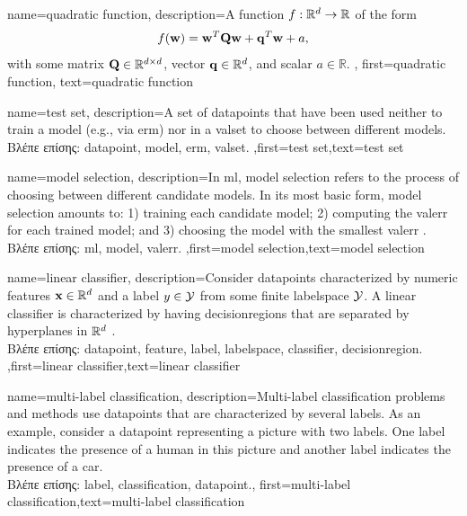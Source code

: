 {name={quadratic function},
	description={A function $f: \mathbb{R}^{d} \rightarrow \mathbb{R}$ of the form 
		$$f({\bf w}) =  {\bf w}^{T} \mathbf{Q} \mathbf{w} + \mathbf{q}^{T} {\bf w}+a,$$ with 
		some matrix $\mathbf{Q} \in \mathbb{R}^{d \times d}$, vector ${\bf q} \in \mathbb{R}^{d}$, 
		and scalar $a \in \mathbb{R}$.  },
		first={quadratic function},
		text={quadratic function}  
}

{name={test set},
	description={A set of \gls{datapoint}s that have  
		been used neither to train a \gls{model} (e.g., via \gls{erm}) nor in a \gls{valset} 
		to choose between different \gls{model}s.\\
		\foreignlanguage{greek}{Βλέπε επίσης:} \gls{datapoint}, \gls{model}, \gls{erm}, \gls{valset}.
		},first={test set},text={test set}  
}

{name={model selection},
	description={In \gls{ml}, \gls{model} selection refers to the 
		process of choosing between different candidate \gls{model}s. In its most 
		basic form, \gls{model} selection amounts to: 1) training each candidate \gls{model}; 
		2) computing the \gls{valerr} for each trained \gls{model}; and 3) choosing the \gls{model} 
		with the smallest \gls{valerr} \cite[Ch. 6]{MLBasics}.\\
		\foreignlanguage{greek}{Βλέπε επίσης:} \gls{ml}, \gls{model}, \gls{valerr}.
		 },first={model selection},text={model selection}  
}

{name={linear classifier}, 
	description={Consider \gls{datapoint}s characterized by numeric \gls{feature}s ${\bf x} \in \mathbb{R}^{d}$ 
	    and a \gls{label} $y \in \mathcal{Y}$ from some finite \gls{labelspace} $\mathcal{Y}$. 
		A linear \gls{classifier} is characterized by having \gls{decisionregion}s that are 
		separated by hyperplanes in $\mathbb{R}^{d}$ \cite[Ch. 2]{MLBasics}.\\
		\foreignlanguage{greek}{Βλέπε επίσης:} \gls{datapoint}, \gls{feature}, \gls{label}, \gls{labelspace}, \gls{classifier}, \gls{decisionregion}.
		},first={linear classifier},text={linear classifier} }

{name={multi-label classification}, 
	description={Multi-\gls{label} 
		\gls{classification} problems and methods use \gls{datapoint}s 
		that are characterized by several \gls{label}s. As an example, consider a \gls{datapoint} 
		representing a picture with two \gls{label}s. One \gls{label} indicates the presence of a human 
		in this picture and another \gls{label} indicates the presence of a car.\\
		\foreignlanguage{greek}{Βλέπε επίσης:} \gls{label}, \gls{classification}, \gls{datapoint}.},
	    first={multi-label classification},text={multi-label classification} }

